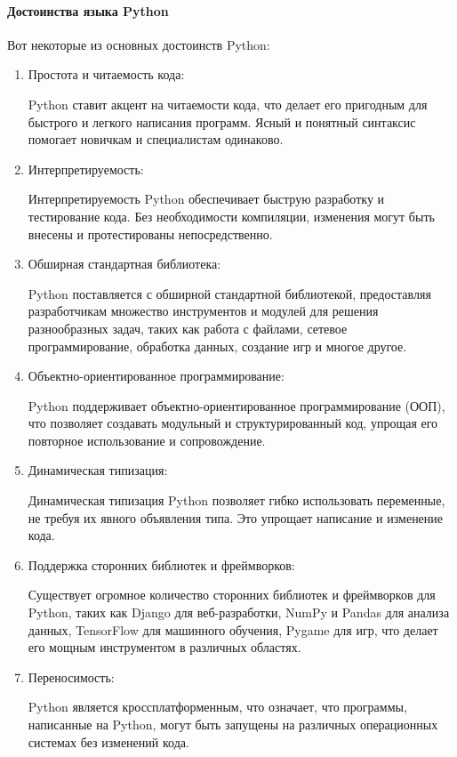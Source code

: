 \paragraph{Достоинства языка Python}

Вот некоторые из основных достоинств Python:

\begin{enumerate}
	\item Простота и читаемость кода:
	
	Python ставит акцент на читаемости кода, что делает его пригодным для быстрого и легкого написания программ. Ясный и понятный синтаксис помогает новичкам и специалистам одинаково.
	\item Интерпретируемость:
	
	Интерпретируемость Python обеспечивает быструю разработку и тестирование кода. Без необходимости компиляции, изменения могут быть внесены и протестированы непосредственно.
	\item Обширная стандартная библиотека:
	
	Python поставляется с обширной стандартной библиотекой, предоставляя разработчикам множество инструментов и модулей для решения разнообразных задач, таких как работа с файлами, сетевое программирование, обработка данных, создание игр и многое другое.
	\item Объектно-ориентированное программирование:
	
	Python поддерживает объектно-ориентированное программирование (ООП), что позволяет создавать модульный и структурированный код, упрощая его повторное использование и сопровождение.
	\item Динамическая типизация:
	
	Динамическая типизация Python позволяет гибко использовать переменные, не требуя их явного объявления типа. Это упрощает написание и изменение кода.
	\item Поддержка сторонних библиотек и фреймворков:
	
	Существует огромное количество сторонних библиотек и фреймворков для Python, таких как Django для веб-разработки, NumPy и Pandas для анализа данных, TensorFlow для машинного обучения, Pygame для игр, что делает его мощным инструментом в различных областях.
	\item Переносимость:
	
	Python является кроссплатформенным, что означает, что программы, написанные на Python, могут быть запущены на различных операционных системах без изменений кода.
\end{enumerate}

